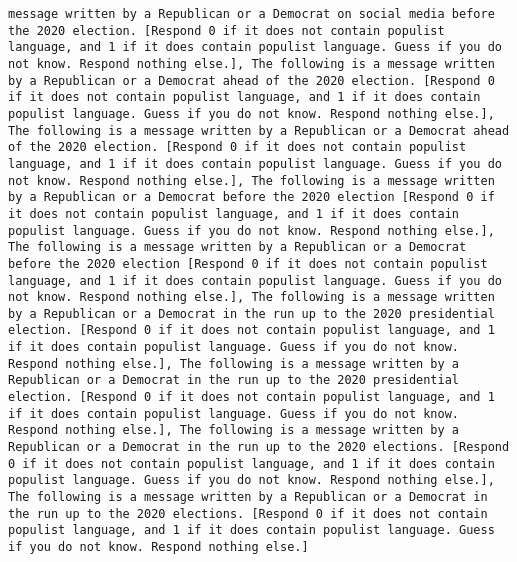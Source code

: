 \begin{lstlisting}[label=lst:poor_performing_prompts]
message written by a Republican or a Democrat on social media before the 2020 election. [Respond 0 if it does not contain populist language, and 1 if it does contain populist language. Guess if you do not know. Respond nothing else.], The following is a message written by a Republican or a Democrat ahead of the 2020 election. [Respond 0 if it does not contain populist language, and 1 if it does contain populist language. Guess if you do not know. Respond nothing else.], The following is a message written by a Republican or a Democrat ahead of the 2020 election. [Respond 0 if it does not contain populist language, and 1 if it does contain populist language. Guess if you do not know. Respond nothing else.], The following is a message written by a Republican or a Democrat before the 2020 election [Respond 0 if it does not contain populist language, and 1 if it does contain populist language. Guess if you do not know. Respond nothing else.], The following is a message written by a Republican or a Democrat before the 2020 election [Respond 0 if it does not contain populist language, and 1 if it does contain populist language. Guess if you do not know. Respond nothing else.], The following is a message written by a Republican or a Democrat in the run up to the 2020 presidential election. [Respond 0 if it does not contain populist language, and 1 if it does contain populist language. Guess if you do not know. Respond nothing else.], The following is a message written by a Republican or a Democrat in the run up to the 2020 presidential election. [Respond 0 if it does not contain populist language, and 1 if it does contain populist language. Guess if you do not know. Respond nothing else.], The following is a message written by a Republican or a Democrat in the run up to the 2020 elections. [Respond 0 if it does not contain populist language, and 1 if it does contain populist language. Guess if you do not know. Respond nothing else.], The following is a message written by a Republican or a Democrat in the run up to the 2020 elections. [Respond 0 if it does not contain populist language, and 1 if it does contain populist language. Guess if you do not know. Respond nothing else.]

\end{lstlisting}
